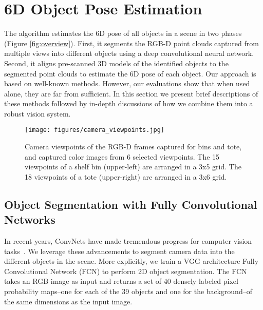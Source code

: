 \documentclass[letterpaper, 10 pt, conference]{ieeeconf}  %
\begin{document}
\section{6D Object Pose Estimation}
\label{sec:pose_estimate}
The algorithm estimates the 6D pose of all objects in a scene in two phases (Figure \ref{fig:overview}).
First, it segments the RGB-D point clouds captured from multiple views into different objects using a deep convolutional neural network.
Second, it aligns pre-scanned 3D models of the identified objects to the segmented point clouds to estimate the 6D pose of each object.
Our approach is based on well-known methods. However, our evaluations show that when used alone, they are far from sufficient. In this section we present brief descriptions of these methods followed by in-depth discussions of how we combine them into a robust vision system.

\begin{figure}[t]
\vspace{2mm}
\centering
  \texttt{[image: figures/camera\_viewpoints.jpg]}
  \caption{Camera viewpoints of the RGB-D frames captured for bins and tote, and captured color images from 6 selected viewpoints. The 15 viewpoints of a shelf bin (upper-left) are arranged in a 3x5 grid. The 18 viewpoints of a tote (upper-right) are arranged in a 3x6 grid.}
  \label{fig:viewpoint}
  \vspace{-5mm}
\end{figure}



\subsection{Object Segmentation with Fully Convolutional Networks}
In recent years, ConvNets have made tremendous progress for computer vision tasks~\cite{girshick2014rich,long2015fully}. We leverage these advancements to segment camera data into the different objects in the scene. More explicitly, we train a VGG architecture \cite{simonyan2014very} Fully Convolutional Network (FCN) \cite{long2015fully} to perform 2D object segmentation. The FCN takes an RGB image as input and returns a set of 40 densely labeled pixel probability maps--one for each of the 39 objects and one for the background--of the same dimensions as the input image.
\end{document}
